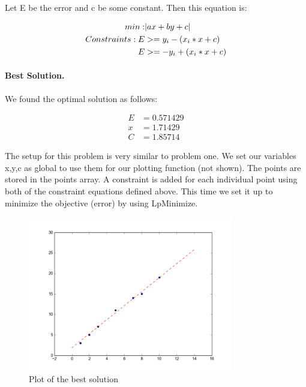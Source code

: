 \documentclass[11pt,letterpaper]{article}
\begin{document}
Let E be the error and c be some constant. Then this equation is: 

\begin{align*}
 min: \bigskip &|ax + by +c| \\
 Constraints: \bigskip E &>= y_i - (x_i * x + c) \\
 E &>= -y_i + (x_i * x + c)
\end{align*}


\paragraph{Best Solution.} \bigskip We found the optimal solution as follows:

\begin{align*}
 E &= 0.571429 \\
 x &= 1.71429 \\
 C &= 1.85714 
\end{align*}

The setup for this problem is very similar to problem one.   We set our variables x,y,c as global to use them for our plotting function (not shown).  The points are stored in the points array.  A constraint is added for each individual point using both of the constraint equations defined above.  This time we set it up to minimize the objective (error) by using LpMinimize. 

\begin{figure}[h!]
\centering
\includegraphics[width=0.8\textwidth]{figure_1}
\caption{Plot of the best solution}
\end{figure} 

\pagebreak 
\end{document}

